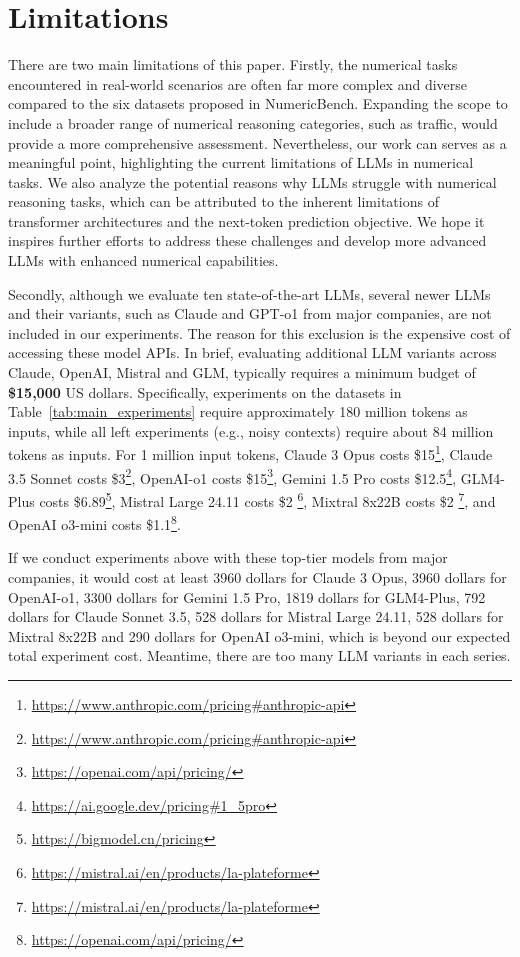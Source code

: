 \section*{Limitations}
There are two main limitations of this paper.
Firstly, the numerical tasks encountered in real-world scenarios are often far more complex and diverse compared to the six datasets proposed in NumericBench. 
Expanding the scope to include a broader range of numerical reasoning categories, such as traffic, would provide a more comprehensive assessment. 
Nevertheless,  our work can serves as a meaningful  point, highlighting  the current limitations of LLMs in numerical tasks. 
We also analyze the potential reasons why LLMs struggle with numerical reasoning tasks, which can be attributed to the inherent limitations of transformer architectures and the next-token prediction objective.
We
hope it inspires further efforts to address these challenges and develop   more advanced LLMs with enhanced numerical  capabilities.



Secondly, although we evaluate ten state-of-the-art LLMs, several newer LLMs and their variants, such as Claude and GPT-o1 from major companies, are not included in our experiments. 
The reason for this exclusion is the expensive cost of accessing these model APIs. 
In brief, evaluating additional LLM variants across Claude, OpenAI, Mistral and GLM, typically requires a minimum budget of \textbf{\$15,000} US dollars.
Specifically, experiments on the datasets in Table~\ref{tab:main_experiments} require approximately 180 million tokens as inputs, while all left experiments (e.g., noisy contexts) require about 84 million tokens as inputs. 
For 1 million input tokens, Claude 3 Opus costs \$15\footnote{\url{https://www.anthropic.com/pricing\#anthropic-api}}, 
Claude 3.5 Sonnet costs \$3\footnote{\url{https://www.anthropic.com/pricing\#anthropic-api}}, 
OpenAI-o1 costs \$15\footnote{\url{https://openai.com/api/pricing/}}, 
Gemini 1.5 Pro costs \$12.5\footnote{\url{https://ai.google.dev/pricing\#1_5pro}}, 
GLM4-Plus costs \$6.89\footnote{\url{https://bigmodel.cn/pricing}},
Mistral Large 24.11 costs \$2 \footnote{\url{https://mistral.ai/en/products/la-plateforme}},
Mixtral 8x22B costs \$2 \footnote{\url{https://mistral.ai/en/products/la-plateforme}},
and OpenAI o3-mini costs \$1.1\footnote{\url{https://openai.com/api/pricing/}}.

If we conduct experiments above with these top-tier models from major companies, it would cost at least 3960 dollars for Claude 3 Opus, 3960 dollars for OpenAI-o1, 3300 dollars for Gemini 1.5 Pro, 1819 dollars for GLM4-Plus, 792 dollars for Claude Sonnet 3.5, 528 dollars for Mistral Large 24.11, 528 dollars for Mixtral 8x22B and 290 dollars for OpenAI o3-mini, which is beyond our expected total experiment cost. Meantime, there are too many LLM variants in each series.

